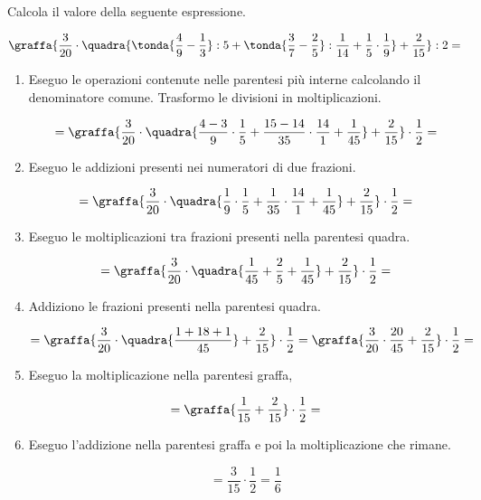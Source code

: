 \begin{esempio}{}{}
  Calcola il valore della seguente espressione.

\[\graffa{
  \frac{3}{20} \cdot \quadra{
    \tonda{\frac{4}{9} - \frac{1}{3}} : 5 + 
    \tonda{\frac{3}{7} - \frac{2}{5}} :
    \frac{1}{14} + \frac{1}{5} \cdot \frac{1}{9}}+
  \frac{2}{15}} : 2=\]
\begin{enumerate} %
 \item 
Eseguo le operazioni contenute nelle parentesi più interne calcolando il 
denominatore comune. 
Trasformo le divisioni in moltiplicazioni.

\vspace{-1em}
\[= \graffa{
  \frac{3}{20} \cdot \quadra{
    \frac{4 - 3}{9} \cdot \frac{1}{5} + 
    \frac{15-14}{35} \cdot \frac{14}{1} +
    \frac{1}{45}} +
  \frac{2}{15}} \cdot \frac{1}{2}=
\]
 \item
Eseguo le addizioni presenti nei numeratori di due frazioni.

\vspace{-1em}
\[= \graffa{
  \frac{3}{20} \cdot \quadra{
    \frac{1}{9} \cdot \frac{1}{5} + 
    \frac{1}{35} \cdot \frac{14}{1} +
    \frac{1}{45}} +
  \frac{2}{15}} \cdot 
\frac{1}{2}=\]
 \item
Eseguo le moltiplicazioni tra frazioni presenti nella parentesi quadra.

\vspace{-1em}
\[= \graffa{
  \frac{3}{20} \cdot \quadra{\frac{1}{45} + \frac{2}{5} + \frac{1}{45}} +
  \frac{2}{15}} \cdot 
\frac{1}{2} =\]
 \item
Addiziono le frazioni presenti nella parentesi quadra.

\vspace{-1em}
\[= \graffa{
  \frac{3}{20} \cdot \quadra{\frac{1+18+1}{45}} +
  \frac{2}{15}} \cdot \frac{1}{2} =
\graffa{\frac{3}{20} \cdot \frac{20}{45} + \frac{2}{15}} \cdot 
\frac{1}{2} =\]
 \item
Eseguo la moltiplicazione nella parentesi graffa,

\vspace{-1em}
\[= \graffa{
  \frac{1}{15} + \frac{2}{15}} \cdot 
\frac{1}{2} =\]
 \item
Eseguo l'addizione nella parentesi graffa e poi la moltiplicazione che rimane.

\vspace{-1em}
\[=\frac{3}{15} \cdot \frac{1}{2} = \frac{1}{6}\]

\end{enumerate}

\end{esempio}

